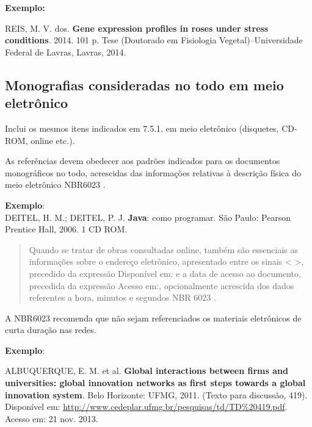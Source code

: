 \begin{exemplomanual}
\textbf{Exemplo:}\\
\begin{singlespace}
REIS, M. V. dos. \textbf{Gene expression profiles in roses under stress conditions}. 2014. 101 p. Tese (Doutorado em Fisiologia Vegetal)–Universidade Federal de Lavras, Lavras, 2014.
\end{singlespace}
\end{exemplomanual}

\subsection{Monografias consideradas no todo em meio eletrônico}

Inclui os mesmos itens indicados em 7.5.1, em meio eletrônico (disquetes, CD-ROM, online etc.).

As referências devem obedecer aos padrões indicados para os documentos monográficos no todo, acrescidas das informações relativas à descrição física do meio eletrônico NBR6023 \cite[p.4]{NBR6023:2002}.

\begin{exemplomanual}
\begin{singlespace}
\textbf{Exemplo}:\\
DEITEL, H. M.; DEITEL, P. J. \textbf{Java}: como programar. São Paulo: Pearson Prentice Hall, 2006. 1 CD ROM.
\end{singlespace}
\end{exemplomanual}

\begin{quote}
Quando se tratar de obras consultadas online, também são essenciais as informações sobre o endereço eletrônico, apresentado entre os sinais < >, precedido da expressão Disponível em: e a data de acesso ao documento, precedida da expressão Acesso em:, opcionalmente acrescida dos dados referentes a hora, minutos e segundos NBR 6023 \cite[p.4]{NBR6023:2002}.
\end{quote}

A NBR6023 \cite{NBR6023:2002} recomenda que não sejam referenciados os materiais eletrônicos de curta duração nas redes.

\begin{exemplomanual}
\textbf{Exemplo}:\\
\begin{singlespace}
ALBUQUERQUE, E. M. et al. \textbf{Global interactions between firms and universities: global innovation networks as first steps towards a global innovation system}.  Belo Horizonte: UFMG, 2011. (Texto para discussão, 419). Disponível em: \url{http://www.cedeplar.ufmg.br/pesquisas/td/TD\%20419.pdf}. Acesso em: 21 nov. 2013.
\end{singlespace}
\end{exemplomanual}


